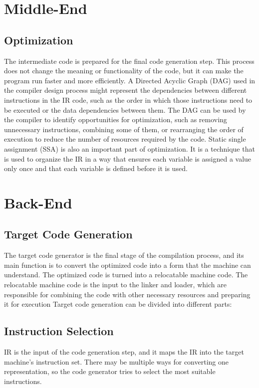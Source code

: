 \section{Middle-End}

\subsection{Optimization}
The intermediate code is prepared for the final code generation step. This process does not change the meaning or functionality of the code, but it can make the program run faster and more efficiently.
A Directed Acyclic Graph (DAG) used in the compiler design process might represent the dependencies between different instructions in the IR code, such as the order in which those instructions need to be executed or the data dependencies between them. The DAG can be used by the compiler to identify opportunities for optimization, such as removing unnecessary instructions, combining some of them, or rearranging the order of execution to reduce the number of resources required by the code.
Static single assignment (SSA) is also an important part of optimization. It is a technique that is used to organize the IR in a way that ensures each variable is assigned a value only once and that each variable is defined before it is used.

\section{Back-End}



\subsection{Target Code Generation}
The target code generator is the final stage of the compilation process, and its main function is to convert the optimized code into a form that the machine can understand. The optimized code is turned into a relocatable machine code. The relocatable machine code is the input to the linker and loader, which are responsible for combining the code with other necessary resources and preparing it for execution %
Target code generation can be divided into different parts:

\subsection{Instruction Selection} 
IR is the input of the code generation step, and it maps the IR into the target machine’s instruction set. There may be multiple ways for converting one representation, so the code generator tries to select the most suitable instructions.

